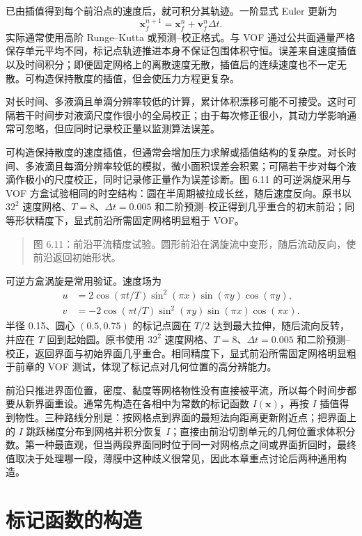 \documentclass[11pt,a4paper,openany,fontset=none]{ctexbook}
\begin{document}
已由插值得到每个前沿点的速度后，就可积分其轨迹。一阶显式 Euler 更新为
\begin{equation}
\bm x_f^{n+1}=\bm x_f^n+\bm v_f^n\Delta t.
\tag{6.20}
\end{equation}
实际通常使用高阶 Runge--Kutta 或预测--校正格式。与 VOF 通过公共面通量严格保存单元平均不同，标记点轨迹推进本身不保证包围体积守恒。误差来自速度插值以及时间积分；即便固定网格上的离散速度无散，插值后的连续速度也不一定无散。可构造保持散度的插值，但会使压力方程更复杂。

对长时间、多液滴且单滴分辨率较低的计算，累计体积漂移可能不可接受。这时可隔若干时间步对液滴尺度作很小的全局校正；由于每次修正很小，其动力学影响通常可忽略，但应同时记录校正量以监测算法误差。

可构造保持散度的速度插值，但通常会增加压力求解或插值结构的复杂度。对长时间、多液滴且每滴分辨率较低的模拟，微小面积误差会积累；可隔若干步对每个液滴作极小的尺度校正，同时记录修正量作为误差诊断。图 6.11 的可逆涡旋采用与 VOF 方盒试验相同的时空结构：圆在半周期被拉成长丝，随后速度反向。原书以 $32^2$ 速度网格、$T=8$、$\Delta t=0.005$ 和二阶预测--校正得到几乎重合的初末前沿；同等形状精度下，显式前沿所需固定网格明显粗于 VOF。

\begin{quote}\small 图 6.11：前沿平流精度试验。圆形前沿在涡旋流中变形，随后流动反向，使前沿返回初始形状。\end{quote}
可逆方盒涡旋是常用验证。速度场为
\begin{align}
u&=2\cos(\pi t/T)\sin^2(\pi x)\sin(\pi y)\cos(\pi y),\\
v&=-2\cos(\pi t/T)\sin^2(\pi y)\sin(\pi x)\cos(\pi x).
\end{align}
半径 0.15、圆心 $(0.5,0.75)$ 的标记点圆在 $T/2$ 达到最大拉伸，随后流向反转，并应在 $T$ 回到起始圆。原书使用 $32^2$ 速度网格、$T=8$、$\Delta t=0.005$ 和二阶预测--校正，返回界面与初始界面几乎重合。相同精度下，显式前沿所需固定网格明显粗于前章的 VOF 测试，体现了标记点对几何位置的高分辨能力。

前沿只推进界面位置，密度、黏度等网格物性没有直接被平流，所以每个时间步都要从新界面重设。通常先构造在各相中为常数的标记函数 $I(\bm x)$，再按 $I$ 插值得到物性。三种路线分别是：按网格点到界面的最短法向距离更新附近点；把界面上的 $I$ 跳跃梯度分布到网格并积分恢复 $I$；直接由前沿切割单元的几何位置求体积分数。第一种最直观，但当两段界面同时位于同一对网格点之间或界面折回时，最终值取决于处理哪一段，薄膜中这种歧义很常见，因此本章重点讨论后两种通用构造。

\section{标记函数的构造}
\end{document}
